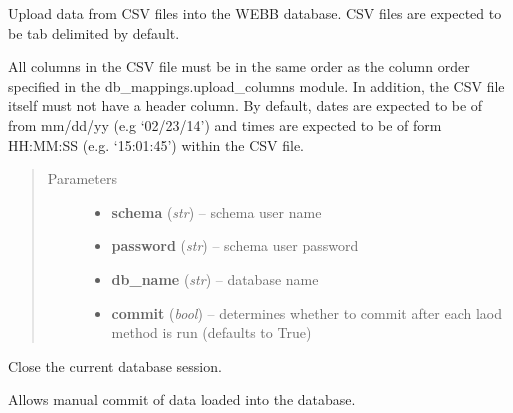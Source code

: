 \documentclass[letterpaper,10pt,english]{sphinxmanual}
\begin{document}

\begin{fulllineitems}
\label{modules:webb_utils.upload_data.UploadData}
Upload data from CSV files into the WEBB database.
CSV files are expected to be tab delimited by default.

All columns in the CSV file must be in the same order as the
column order specified in the db\_mappings.upload\_columns
module. In addition, the CSV file itself must not have 
a header column. By default, dates are expected to be of
from mm/dd/yy (e.g `02/23/14') and times are expected to
be of form HH:MM:SS (e.g. `15:01:45') within the CSV
file.
\begin{quote}\begin{description}
\item[{Parameters}] \leavevmode\begin{itemize}
\item {} 
\textbf{schema} (\emph{str}) -- schema user name

\item {} 
\textbf{password} (\emph{str}) -- schema user password

\item {} 
\textbf{db\_name} (\emph{str}) -- database name

\item {} 
\textbf{commit} (\emph{bool}) -- determines whether to commit after each laod method is run (defaults to True)

\end{itemize}

\end{description}\end{quote}

\begin{fulllineitems}
\label{modules:webb_utils.upload_data.UploadData.close_session}
Close the current database session.

\end{fulllineitems}


\begin{fulllineitems}
\label{modules:webb_utils.upload_data.UploadData.commit_session_loads}
Allows manual commit of data loaded
into the database.


\end{fulllineitems}
\end{fulllineitems}
\end{document}
